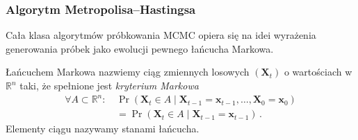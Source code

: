 \documentclass{myclass}
\numberwithin{equation}{subsection}
\begin{document}
\subsubsection{Algorytm Metropolisa--Hastingsa}

Cała klasa algorytmów próbkowania MCMC opiera się na idei wyrażenia generowania próbek jako ewolucji
pewnego łańcucha Markowa.

\begin{definition}
Łańcuchem Markowa nazwiemy ciąg zmiennych losowych \((\bm{X}_t)\) o wartościach w \(\mathbb{R}^n\)
taki, że spełnione jest \emph{kryterium Markowa}
\[
\begin{split}
\forall A \subset \mathbb{R}^n :\, &\Pr(\bm{X}_t \in A \mid \bm{X}_{t-1} = \bm{x}_{t-1}, \ldots, \bm{X}_0 = \bm{x}_0) \\
&= \Pr(\bm{X}_t \in A \mid \bm{X}_{t-1} = \bm{x}_{t-1})\,.
\end{split}
\]
Elementy ciągu nazywamy stanami łańcucha.
\end{definition}
\end{document}
